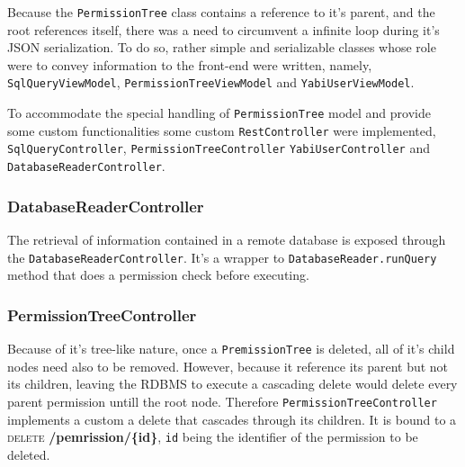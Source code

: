 Because the \texttt{PermissionTree} class contains a reference to it's parent, and the root references itself, there was a need to circumvent a infinite loop during it's \gls{JSON} serialization. To do so, rather simple and 
serializable classes whose role were to convey information to the front-end were written, namely, \texttt{SqlQueryViewModel}, \texttt{PermissionTreeViewModel} and \texttt{YabiUserViewModel}.

To accommodate the special handling of \texttt{PermissionTree} model and provide some custom functionalities some custom \texttt{RestController} were implemented, \texttt{SqlQueryController}, \texttt{PermissionTreeController} \texttt{YabiUserController} and \texttt{DatabaseReaderController}.



\subsubsection{DatabaseReaderController}
The retrieval of information contained in a remote database is exposed through the \texttt{DatabaseReaderController}. It's a wrapper to \texttt{DatabaseReader.runQuery} method that does a permission check before executing.

\subsubsection{PermissionTreeController}
Because of it's tree-like nature, once a \texttt{PremissionTree} is deleted, all of it's child nodes need also to be removed. However, because it reference its parent but not its children, leaving the \gls{RDBMS} to execute a cascading delete would delete every parent permission untill the root node.
Therefore \texttt{PermissionTreeController} implements a custom a delete that cascades through its children. It is bound to a \textsc{delete} \textbf{/pemrission/\{id\}}, \texttt{id} being the identifier of the permission to be deleted.


